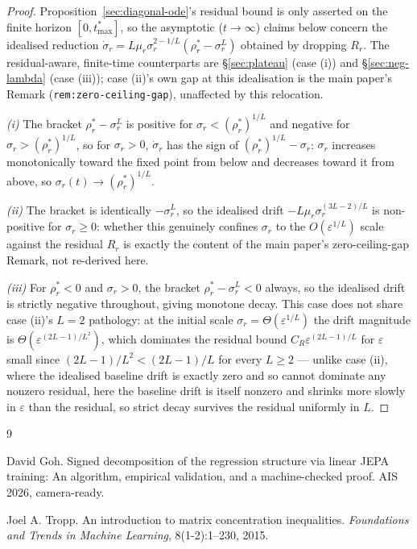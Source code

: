 \documentclass[11pt]{article}
\newcommand{\eps}{\varepsilon}
\newcommand{\rhostar}{\rho_r^*}
\newcommand{\sigmar}{\sigma_r}
\theoremstyle{plain}
\theoremstyle{definition}
\theoremstyle{remark}
\begin{document}
\begin{proof}
Proposition~\ref{sec:diagonal-ode}'s residual bound is only asserted on the finite
horizon $[0,t_{\max}^*]$, so the asymptotic ($t\to\infty$) claims below concern the
idealised reduction $\dot\sigmar = L\mu_r\sigmar^{2-1/L}(\rhostar-\sigmar^L)$
obtained by dropping $R_r$. The residual-aware, finite-time counterparts are
\S\ref{sec:plateau} (case (i)) and \S\ref{sec:neg-lambda} (case (iii)); case (ii)'s
own gap at this idealisation is the main paper's Remark
(\texttt{rem:zero-ceiling-gap}), unaffected by this relocation.

\emph{(i)} The bracket $\rhostar-\sigmar^L$ is positive for $\sigmar<(\rhostar)^{1/L}$
and negative for $\sigmar>(\rhostar)^{1/L}$, so for $\sigmar>0$, $\dot\sigmar$ has
the sign of $(\rhostar)^{1/L}-\sigmar$: $\sigmar$ increases monotonically toward the
fixed point from below and decreases toward it from above, so
$\sigmar(t)\to(\rhostar)^{1/L}$.

\emph{(ii)} The bracket is identically $-\sigmar^L$, so the idealised drift
$-L\mu_r\sigmar^{(3L-2)/L}$ is non-positive for $\sigmar\ge0$: whether this
genuinely confines $\sigmar$ to the $O(\eps^{1/L})$ scale against the residual
$R_r$ is exactly the content of the main paper's zero-ceiling-gap Remark, not
re-derived here.

\emph{(iii)} For $\rhostar<0$ and $\sigmar>0$, the bracket $\rhostar-\sigmar^L<0$
always, so the idealised drift is strictly negative throughout, giving monotone
decay. This case does not share case (ii)'s $L=2$ pathology: at the initial scale
$\sigmar=\Theta(\eps^{1/L})$ the drift magnitude is $\Theta(\eps^{(2L-1)/L^2})$,
which dominates the residual bound $C_R\eps^{(2L-1)/L}$ for $\eps$ small since
$(2L-1)/L^2 < (2L-1)/L$ for every $L\ge2$ — unlike case (ii), where the idealised
baseline drift is exactly zero and so cannot dominate any nonzero residual, here the
baseline drift is itself nonzero and shrinks more slowly in $\eps$ than the
residual, so strict decay survives the residual uniformly in $L$.
\end{proof}


\begin{thebibliography}{9}

David Goh.
\newblock Signed decomposition of the regression structure via linear JEPA
  training: An algorithm, empirical validation, and a machine-checked proof.
\newblock AIS 2026, camera-ready.

Joel A. Tropp.
\newblock An introduction to matrix concentration inequalities.
\newblock \emph{Foundations and Trends in Machine Learning}, 8(1-2):1--230,
  2015.

\end{thebibliography}
\end{document}
